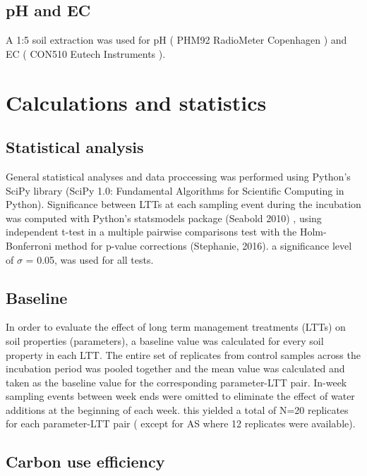 \documentclass[12pt]{report}
\newcommand{\myGreen}[1]{\textcolor{olive}{#1}} %
\begin{document}
\subsection{pH and EC}

A 1:5 soil extraction was used for pH ( PHM92 RadioMeter Copenhagen ) and EC ( CON510 Eutech Instruments ).


\section{Calculations and statistics}

\subsection{Statistical analysis}

General statistical analyses and data proccessing was performed using Python’s SciPy library (SciPy 1.0: Fundamental Algorithms for Scientific Computing in Python). Significance between LTTs at each sampling event during the incubation was computed with Python’s statsmodels package (Seabold 2010) , using independent t-test in a multiple pairwise comparisons test with the Holm-Bonferroni method for p-value corrections (Stephanie, 2016). a significance level of $\sigma$  = 0.05, was used for all tests. \\

\subsection{Baseline}

In order to evaluate the effect of long term management treatments (LTTs) on soil properties (parameters), a baseline value was calculated for every soil property in each LTT. The entire set of replicates from control samples across the incubation period was pooled together and the mean value was calculated and taken as the baseline value for the corresponding parameter-LTT pair. In-week sampling events between week ends were omitted to eliminate the effect of water additions at the beginning of each week. this yielded a total of N=20 replicates for each parameter-LTT pair ( except for AS where 12 replicates were available). 

\subsection{Carbon use efficiency}
\end{document}
